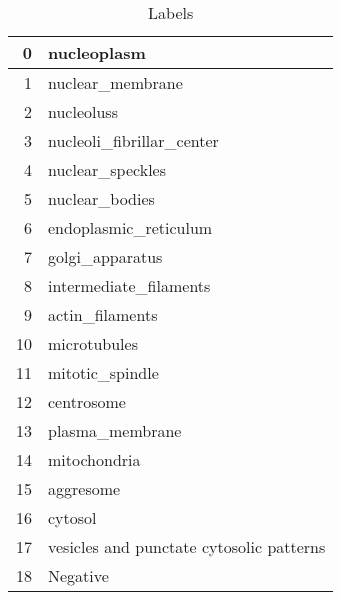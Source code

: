 \documentclass[]{article}
\begin{document}
\begin{table}[H]
\begin{center}
	\caption{Labels}
	\begin{tabular}{|r|l|} \hline
			 0&\gls{nucleoplasm}\\ \hline
			 1&\gls{nuclear_membrane}\\ \hline
			 2&\glspl{nucleolus}\\ \hline
			 3&\gls{nucleoli_fibrillar_center}\\ \hline
			 4&\gls{nuclear_speckles}\\ \hline
			 5&\gls{nuclear_bodies}\\ \hline
			 6&\gls{endoplasmic_reticulum}\\ \hline
			 7&\gls{golgi_apparatus}\\ \hline
			 8&\gls{intermediate_filaments}\\\hline
			 9&\gls{actin_filaments}\\\hline
			 10&\gls{microtubules}\\\hline
			 11&\gls{mitotic_spindle}\\\hline
			 12&\gls{centrosome}\\\hline
			 13&\gls{plasma_membrane}\\\hline
			 14&\gls{mitochondria}\\\hline
			 15&\gls{aggresome}\\\hline
			 16&\gls{cytosol}\\\hline
			 17&\gls{vesicles} and \gls{punctate} cytosolic patterns\\\hline
			 18&Negative \\ \hline
	\end{tabular}
\end{center}
\end{table}



\clearpage

\printglossary



\end{document}
